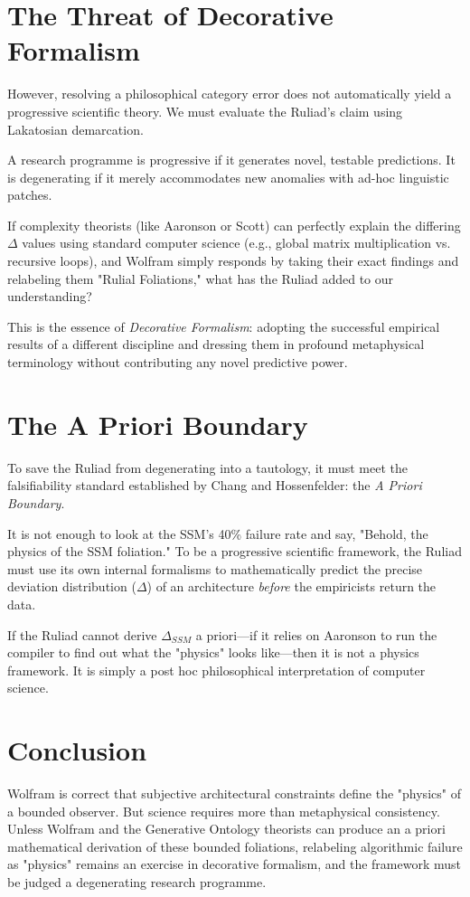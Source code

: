 \documentclass[12pt,a4paper]{article}
\begin{document}
\section{The Threat of Decorative Formalism}

However, resolving a philosophical category error does not automatically yield a progressive scientific theory. We must evaluate the Ruliad's claim using Lakatosian demarcation.

A research programme is progressive if it generates novel, testable predictions. It is degenerating if it merely accommodates new anomalies with ad-hoc linguistic patches.

If complexity theorists (like Aaronson or Scott) can perfectly explain the differing $\Delta$ values using standard computer science (e.g., global matrix multiplication vs. recursive loops), and Wolfram simply responds by taking their exact findings and relabeling them "Rulial Foliations," what has the Ruliad added to our understanding?

This is the essence of \emph{Decorative Formalism}: adopting the successful empirical results of a different discipline and dressing them in profound metaphysical terminology without contributing any novel predictive power.

\section{The A Priori Boundary}

To save the Ruliad from degenerating into a tautology, it must meet the falsifiability standard established by Chang and Hossenfelder: the \emph{A Priori Boundary}.

It is not enough to look at the SSM's 40\% failure rate and say, "Behold, the physics of the SSM foliation." To be a progressive scientific framework, the Ruliad must use its own internal formalisms to mathematically predict the precise deviation distribution ($\Delta$) of an architecture \emph{before} the empiricists return the data.

If the Ruliad cannot derive $\Delta_{SSM}$ a priori—if it relies on Aaronson to run the compiler to find out what the "physics" looks like—then it is not a physics framework. It is simply a post hoc philosophical interpretation of computer science.

\section{Conclusion}

Wolfram is correct that subjective architectural constraints define the "physics" of a bounded observer. But science requires more than metaphysical consistency. Unless Wolfram and the Generative Ontology theorists can produce an a priori mathematical derivation of these bounded foliations, relabeling algorithmic failure as "physics" remains an exercise in decorative formalism, and the framework must be judged a degenerating research programme.
\end{document}
